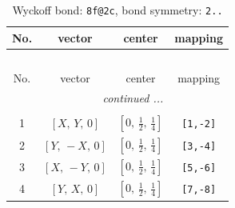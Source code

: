 \documentclass[fleqn,8pt]{jsarticle}
\begin{document}
\renewcommand{\arraystretch}{1.2}
\begin{longtable}{cccc}
\caption{Wyckoff bond: {\tt 8f@2c}, bond symmetry: {\tt 2..}}
 \\
 \hline \hline
No. & vector & center & mapping \\ \hline \endfirsthead

\multicolumn{3}{l}{\tablename\ \thetable{}} \\
 \hline \hline
No. & vector & center & mapping \\ \hline \endhead

 \hline \hline
\multicolumn{3}{r}{\footnotesize\it continued ...} \\ \endfoot

 \hline \hline
\multicolumn{3}{r}{} \\ \endlastfoot

1 & $\left[ X,\, Y,\, 0 \right]$ & $\left[ 0,\, \frac{1}{2},\, \frac{1}{4} \right]$ & {\tt [1,-2]} \\ \hline
2 & $\left[ Y,\, - X,\, 0 \right]$ & $\left[ 0,\, \frac{1}{2},\, \frac{1}{4} \right]$ & {\tt [3,-4]} \\ \hline
3 & $\left[ X,\, - Y,\, 0 \right]$ & $\left[ 0,\, \frac{1}{2},\, \frac{1}{4} \right]$ & {\tt [5,-6]} \\ \hline
4 & $\left[ Y,\, X,\, 0 \right]$ & $\left[ 0,\, \frac{1}{2},\, \frac{1}{4} \right]$ & {\tt [7,-8]} \\
\end{longtable}
\renewcommand{\arraystretch}{1.2}
\end{document}
